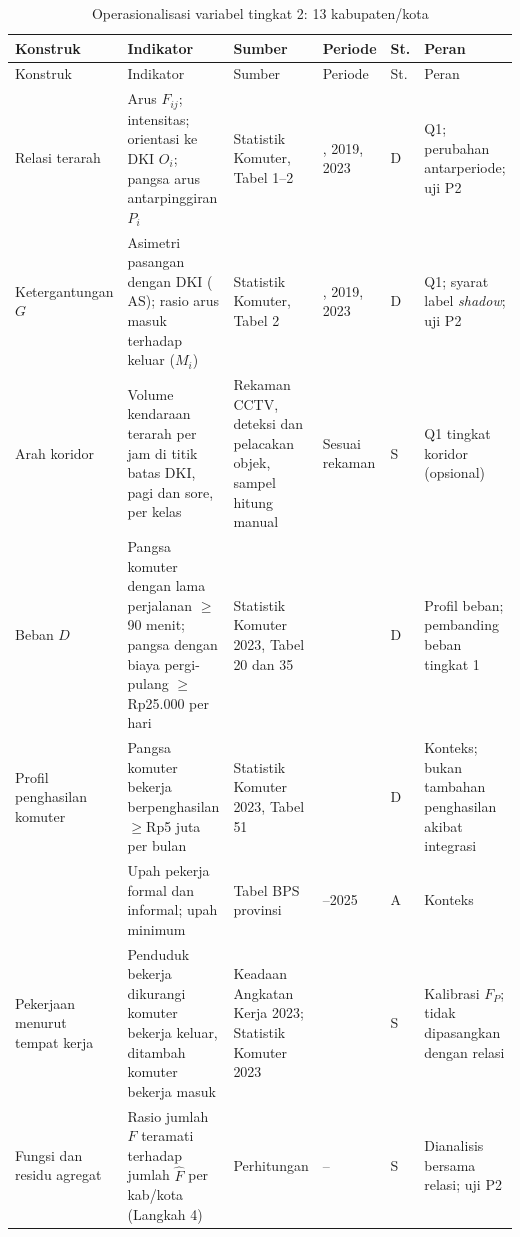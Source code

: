 \documentclass[12pt,a4paper,oneside,openany,indonesian]{report}
\begin{document}
\begingroup
\footnotesize
\begin{longtable}{>{\raggedright\arraybackslash}p{} >{\raggedright\arraybackslash}p{} >{\raggedright\arraybackslash}p{} >{\raggedright\arraybackslash}p{} >{\centering\arraybackslash}p{} >{\raggedright\arraybackslash}p{}}
\caption{Operasionalisasi variabel tingkat 2: 13 kabupaten/kota}\label{tab:bab3-operasionalisasi-t2}\\
\toprule
Konstruk & Indikator & Sumber & Periode & St. & Peran \\
\midrule
\endfirsthead
\toprule
Konstruk & Indikator & Sumber & Periode & St. & Peran \\
\midrule
\endhead
\bottomrule
\endlastfoot
Relasi terarah & Arus $F_{ij}$; intensitas; orientasi ke DKI $O_i$; pangsa arus antarpinggiran $P_i$ & Statistik Komuter, Tabel 1--2 & 2014, 2019, 2023 & D & Q1; perubahan antarperiode; uji P2 \\
Ketergan\-tungan $G$ & Asimetri pasangan dengan DKI ($\mathrm{AS}$); rasio arus masuk terhadap keluar ($M_i$) & Statistik Komuter, Tabel 2 & 2014, 2019, 2023 & D & Q1; syarat label \emph{shadow}; uji P2 \\
Arah koridor & Volume kendaraan terarah per jam di titik batas DKI, pagi dan sore, per kelas & Rekaman CCTV, deteksi dan pelacakan objek, sampel hitung manual & Sesuai rekaman & S & Q1 tingkat koridor (opsional) \\
Beban $D$ & Pangsa komuter dengan lama perjalanan $\geq$90 menit; pangsa dengan biaya pergi-pulang $\geq$Rp25.000 per hari & Statistik Komuter 2023, Tabel 20 dan 35 & 2023 & D & Profil beban; pembanding beban tingkat 1 \\
Profil penghasilan komuter & Pangsa komuter bekerja berpenghasilan $\geq$Rp5 juta per bulan & Statistik Komuter 2023, Tabel 51 & 2023 & D & Konteks; bukan tambahan penghasilan akibat integrasi \\
 & Upah pekerja formal dan informal; upah minimum & Tabel BPS provinsi & 2019--2025 & A & Konteks \\
Pekerjaan menurut tempat kerja & Penduduk bekerja dikurangi komuter bekerja keluar, ditambah komuter bekerja masuk & Keadaan Angkatan Kerja 2023; Statistik Komuter 2023 & 2023 & S & Kalibrasi $F_P$; tidak dipasangkan dengan relasi \\
Fungsi dan residu agregat & Rasio jumlah $F$ teramati terhadap jumlah $\widehat F$ per kab/kota (Langkah 4) & Perhitungan & -- & S & Dianalisis bersama relasi; uji P2 \\
\end{longtable}
\endgroup
\end{document}

